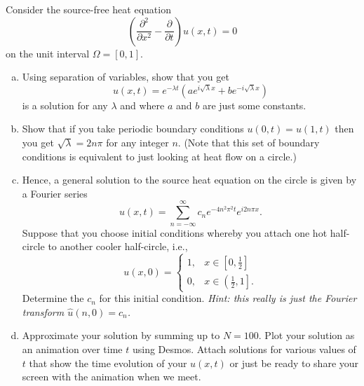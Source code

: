 \documentclass[12pt]{amsbook}
\begin{document}
\newpage
\begin{problem}
Consider the source-free heat equation
\[
\left(\frac{\partial^2}{\partial x^2}-\frac{\partial}{\partial t}\right) u(x,t) = 0
\] 
on the unit interval $\Omega=[0,1]$.
\begin{enumerate}[(a)]
\item Using separation of variables, show that you get 
\[
u(x,t) = e^{-\lambda t} (a e^{i\sqrt{\lambda}x}+b e^{-i\sqrt{\lambda}x})
\]
is a solution for any $\lambda$ and where $a$ and $b$ are just some constants.
\item Show that if you take periodic boundary conditions $u(0,t)=u(1,t)$ then you get $\sqrt{\lambda}=2n\pi$ for any integer $n$. (Note that this set of boundary conditions is equivalent to just looking at heat flow on a circle.)
\item  Hence, a general solution to the source heat equation on the circle is given by a Fourier series
\[
u(x,t) = \sum_{n=-\infty}^\infty c_n e^{-4n^2 \pi^2 t}e^{i2n\pi x}.
\] 
Suppose that you choose initial conditions whereby you attach one hot half-circle to another cooler half-circle, i.e.,
\[
u(x,0) = \begin{cases} 1, & x \in \left[0,\frac{1}{2}\right]\\
						  0, & x \in \left(\frac{1}{2},1\right].
\end{cases}
\]
Determine the $c_n$ for this initial condition. \emph{Hint: this really is just the Fourier transform $\hat{u}(n,0)=c_n$.}
\item Approximate your solution by summing up to $N=100$. Plot your solution as an animation over time $t$ using Desmos. Attach solutions for various values of $t$ that show the time evolution of your $u(x,t)$ or just be ready to share your screen with the animation when we meet.
\end{enumerate}
\end{problem}
\end{document}

